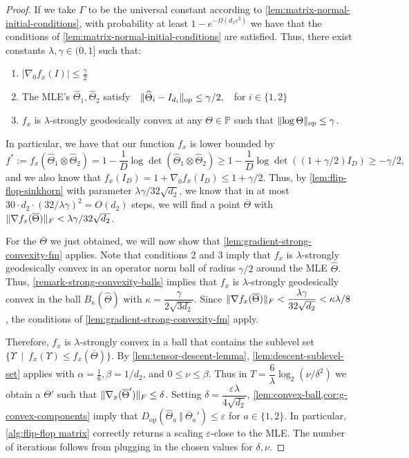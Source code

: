 \documentclass[aos]{imsart}
\theoremstyle{definition}
\numberwithin{equation}{section}
\DeclareMathOperator{\op}{op}
\DeclarePairedDelimiter{\norm}{\lVert}{\rVert}
\newcommand{\otheta}{\overline{\Theta}}
\newcommand{\htheta}{\widehat{\Theta}}
\newcommand{\ot}{\otimes}
\newcommand{\eps}{\varepsilon}
\newcommand{\SPD}{\mathbb{P}}
\newcommand{\Dop}{D_{\operatorname{op}}}
\begin{document}
\begin{proof}
If we take $\Gamma$ to be the universal constant according to \cref{lem:matrix-normal-initial-conditions}, with probability at least $1 - e^{- \Omega(d_1 \eps^2)}$ we have that the conditions of \cref{lem:matrix-normal-initial-conditions} are satisfied.
Thus, there exist constants $\lambda, \gamma \in (0, 1]$ such that:
\begin{enumerate}
	\item $|\nabla_0 f_x(I)| \leq \frac{\gamma}{2}$
	\item The MLE's $\htheta_1, \htheta_2$ satisfy $\ \ \norm{\htheta_i - I_{d_i}}_{\op} \leq \gamma/2, \ \ $ for $i \in \{1,2\}$
	\item $f_x$ is $\lambda$-strongly geodesically convex at any $\Theta \in \SPD$ such that $\norm{\log \Theta}_{\op} \leq \gamma$.
\end{enumerate}
In particular, we have that our function $f_x$ is lower bounded by
$$f^* := f_x(\htheta_1 \ot \htheta_2) = 1 - \dfrac{1}{D} \log\det(\htheta_1 \otimes \htheta_2) \geq 1 - \dfrac{1}{D} \log\det((1+\gamma/2) I_D) \geq - \gamma/2,  $$
and we also know that $f_x(I_D) = 1 + \nabla_0 f_x(I_D) \leq 1 + \gamma/2$. Thus, by \cref{lem:flip-flop-sinkhorn} with parameter $\lambda \gamma/32 \sqrt{d_2}$, we know that in at most
$30  \cdot d_2 \cdot \left(32/\lambda \gamma\right)^2 = O(d_2)$ steps, we will find a point $\otheta$ with $\norm{\nabla f_x(\otheta)}_F < \lambda \gamma /32 \sqrt{d_2}$.

For the $\otheta$ we just obtained, we will now show that \cref{lem:gradient-strong-convexity-fm} applies.
Note that conditions 2 and 3 imply that $f_x$ is $\lambda$-strongly geodesically convex in an operator norm ball of radius $\gamma/2$ around the MLE $\htheta$.
Thus, \cref{remark-strong-convexity-balls} implies that $f_x$ is $\lambda$-strongly geodesically convex in the ball $B_\kappa(\htheta)$ with $\kappa = \dfrac{\gamma}{2\sqrt{3d_2}}$.
Since $\norm{\nabla f_x(\otheta)}_F < \dfrac{\lambda \gamma}{32 \sqrt{d_2}} < \kappa \lambda/8$, the conditions of \cref{lem:gradient-strong-convexity-fm} apply.

Therefore, $f_x$ is $\lambda$-strongly convex in a ball that contains the sublevel set $\{ \Upsilon \ \mid \ f_x(\Upsilon) \leq f_x(\otheta) \}$. By \cref{lem:tensor-descent-lemma}, \cref{lem:descent-sublevel-set} applies with $\alpha = \frac{1}{6}, \beta = 1/d_2$, and $0 \leq \nu \leq \beta$. Thus in $T = \dfrac{6}{\lambda} \log_2(\nu/\delta^2)$ we obtain a  $\otheta'$ such that $\norm{\nabla_x(\otheta')}_F \leq \delta$. Setting $\delta = \dfrac{\eps \lambda}{4 \sqrt{d_2}}$, \cref{lem:convex-ball,cor:g-convex-components} imply that $\Dop(\htheta_a \ \Vert  \ \otheta_a') \leq \eps$ for $a \in \{1, 2\}$. In particular, \cref{alg:flip-flop matrix} correctly returns a scaling $\eps$-close to the MLE. The number of iterations follows from plugging in the chosen values for $\delta, \nu$.
\end{proof}
\end{document}
